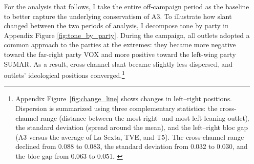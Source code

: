 \documentclass[12pt]{article}
\begin{document}
For the analysis that follows, I take the entire off-campaign period as the baseline to better capture the underlying conservatism of A3. To illustrate how slant changed between the two periods of analysis, I decompose tone by party in Appendix Figure \ref{fig:tone_by_party}. During the campaign, all outlets adopted a common approach to the parties at the extremes: they became more negative toward the far-right party VOX and more positive toward the left-wing party SUMAR. As a result, cross-channel slant became slightly less dispersed, and outlets’ ideological positions converged.\footnote{Appendix Figure~\ref{fig:change_line} shows changes in left–right positions. Dispersion is summarized using three complementary statistics: the cross-channel range (distance between the most right- and most left-leaning outlet), the standard deviation (spread around the mean), and the left–right bloc gap (A3 versus the average of La Sexta, TVE, and T5). The cross-channel range declined from 0.088 to 0.083, the standard deviation from 0.032 to 0.030, and the bloc gap from 0.063 to 0.051. \label{fn:dispersion}}




\end{document}
